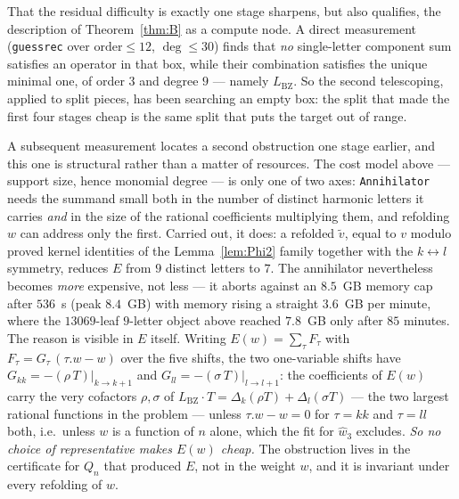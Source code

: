 \documentclass[11pt,reqno]{amsart}
\theoremstyle{plain}
\theoremstyle{definition}
\theoremstyle{remark}
\numberwithin{equation}{section}
\newcommand{\LBZ}{L_{\mathrm{BZ}}}
\newcommand{\wthree}{\hat w_3}
\begin{document}
That the residual difficulty is exactly one stage sharpens, but also qualifies, the description
of Theorem~\ref{thm:B} as a compute node. A direct measurement (\texttt{guessrec} over
$\mathrm{order}\le12$, $\deg\le30$) finds that \emph{no} single-letter component sum satisfies
an operator in that box, while their combination satisfies the unique minimal one, of order $3$
and degree $9$ --- namely $\LBZ$. So the second telescoping, applied to split pieces, has been
searching an empty box: the split that made the first four stages cheap is the same split that
puts the target out of range.

A subsequent measurement locates a second obstruction one stage earlier, and this one is
structural rather than a matter of resources. The cost model above --- support size, hence
monomial degree --- is only one of two axes: \texttt{Annihilator} needs the summand small both
in the number of distinct harmonic letters it carries \emph{and} in the size of the rational
coefficients multiplying them, and refolding $w$ can address only the first. Carried out, it
does: a refolded $\tilde v$, equal to $v$ modulo proved kernel identities of the
Lemma~\ref{lem:Phi2} family together with the $k\leftrightarrow l$ symmetry, reduces $E$ from
$9$ distinct letters to $7$. The annihilator
nevertheless becomes \emph{more} expensive, not less --- it aborts against an $8.5$~GB memory
cap after $536$~s (peak $8.4$~GB) with memory rising a straight $3.6$~GB per minute, where the
$13069$-leaf $9$-letter object above reached $7.8$~GB only after $85$ minutes. The reason is
visible in $E$ itself. Writing $E(w)=\sum_\tau F_\tau$ with $F_\tau=G_\tau\,(\tau.w-w)$ over
the five shifts, the two one-variable shifts have $G_{kk}=-(\rho\,T)|_{k\to k+1}$ and
$G_{ll}=-(\sigma\,T)|_{l\to l+1}$: the coefficients of $E(w)$ carry the very cofactors
$\rho,\sigma$ of $\LBZ\cdot T=\Delta_k(\rho T)+\Delta_l(\sigma T)$ --- the two largest rational
functions in the problem --- unless
$\tau.w-w=0$ for $\tau=kk$ and $\tau=ll$ both, i.e.\ unless $w$ is a function of $n$ alone,
which the fit for $\wthree$ excludes. \emph{So no choice of representative makes $E(w)$ cheap.}
The obstruction lives in the certificate for $Q_n$ that produced $E$, not in the weight $w$,
and it is invariant under every refolding of $w$.
\end{document}
